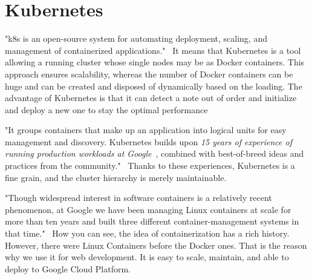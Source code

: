 \section{Kubernetes}\label{sec:kubernetes}
"\acrfull{k8s} is an open-source system for automating deployment, scaling, and management of containerized applications."~\cite{kubernetes}
It means that Kubernetes is a tool allowing a running cluster whose single nodes may be as Docker containers.
This approach ensures scalability, whereas the number of Docker containers can be huge and can be created and disposed of dynamically based on the loading.
The advantage of Kubernetes is that it can detect a note out of order and initialize and deploy a new one to stay the optimal performance

"It groups containers that make up an application into logical units for easy management and discovery.
Kubernetes builds upon \textit{15 years of experience of running production workloads at Google}~\cite{kubernetesArticle}, combined with best-of-breed ideas and practices from the community."~\cite{kubernetes}
Thanks to these experiences, Kubernetes is a fine grain, and the cluster hierarchy is merely maintainable.

"Though widespread interest in software containers is a relatively recent phenomenon, at Google we have been managing Linux containers at scale for more than ten years and built three different container-management systems in that time."~\cite{kubernetesArticle}
How you can see, the idea of containerization has a rich history.
However, there were Linux Containers before the Docker ones.
That is the reason why we use it for web development.
It is easy to scale, maintain, and able to deploy to Google Cloud Platform.